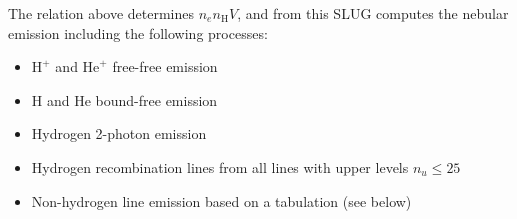 \documentclass[letterpaper,10pt,english]{sphinxmanual}
\begin{document}
The relation above determines \(n_e n_{\mathrm{H}} V\), and from this SLUG computes the nebular emission including the following processes:
\begin{itemize}
\item {} 
\(\mathrm{H}^+\) and \(\mathrm{He}^+\) free-free emission

\item {} 
\(\mathrm{H}\) and \(\mathrm{He}\) bound-free emission

\item {} 
Hydrogen 2-photon emission

\item {} 
Hydrogen recombination lines from all lines with upper levels \(n_u \leq 25\)

\item {} 
Non-hydrogen line emission based on a tabulation (see below)

\end{itemize}
\end{document}
